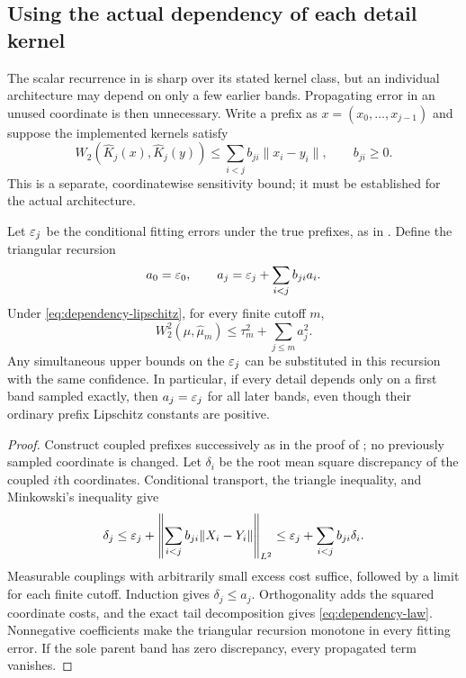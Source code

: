 \subsection{Using the actual dependency of each detail kernel}
The scalar recurrence in  is sharp over its stated kernel class, but an individual architecture may depend on only a few earlier bands. Propagating error in an unused coordinate is then unnecessary. Write a prefix as $x=(x_0,\ldots,x_{j-1})$ and suppose the implemented kernels satisfy
\begin{equation}\label{eq:dependency-lipschitz}
 W_2(\widehat K_j(x),\widehat K_j(y))
 \le\sum_{i<j}b_{ji}\|x_i-y_i\|,\qquad b_{ji}\ge0.
\end{equation}
This is a separate, coordinatewise sensitivity bound; it must be established for the actual architecture.

\begin{theorem}\label{thm:dependency}
Let $\varepsilon_j$ be the conditional fitting errors under the true prefixes, as in . Define the triangular recursion
\begin{equation}\label{eq:dependency-recursion}
 a_0=\varepsilon_0,\qquad a_j=\varepsilon_j+\sum_{i<j}b_{ji}a_i.
\end{equation}
Under \eqref{eq:dependency-lipschitz}, for every finite cutoff $m$,
\begin{equation}\label{eq:dependency-law}
 W_2^2(\mu,\widehat\mu_m)\le\tau_m^2+\sum_{j\le m}a_j^2.
\end{equation}
Any simultaneous upper bounds on the $\varepsilon_j$ can be substituted in this recursion with the same confidence. In particular, if every detail depends only on a first band sampled exactly, then $a_j=\varepsilon_j$ for all later bands, even though their ordinary prefix Lipschitz constants are positive.
\end{theorem}
\begin{proof}
Construct coupled prefixes successively as in the proof of ; no previously sampled coordinate is changed. Let $\delta_i$ be the root mean square discrepancy of the coupled $i$th coordinates. Conditional transport, the triangle inequality, and Minkowski's inequality give
\[
 \delta_j\le\varepsilon_j+
 \left\|\sum_{i<j}b_{ji}\|X_i-Y_i\|\right\|_{L^2}
 \le\varepsilon_j+\sum_{i<j}b_{ji}\delta_i.
\]
Measurable couplings with arbitrarily small excess cost suffice, followed by a limit for each finite cutoff. Induction gives $\delta_j\le a_j$. Orthogonality adds the squared coordinate costs, and the exact tail decomposition gives \eqref{eq:dependency-law}. Nonnegative coefficients make the triangular recursion monotone in every fitting error. If the sole parent band has zero discrepancy, every propagated term vanishes.
\end{proof}

